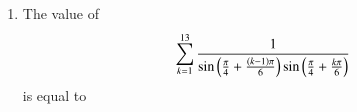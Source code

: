 \documentclass[journal,12pt,twocolumn,article]{IEEEtran}
\theoremstyle{remark}
\begin{document}
\begin{enumerate}[start = 20]
\begin{enumerate}
\begin{multicols}{2}
\end{multicols}
\end{enumerate}
\item The value of 
\begin{align*}
\sum_{k=1}^{13} \frac{1}{\sin\left(\frac{\pi}{4} + \frac{\left(k-1\right)\pi}{6}\right)\sin\left(\frac{\pi}{4} + \frac{k\pi}{6}\right)}
\end{align*}
is equal to
\hfill{}
\begin{enumerate}
\end{enumerate}
\end{enumerate}
\end{document}
